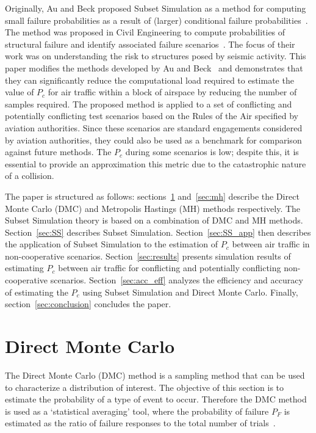 \documentclass[journal]{IEEEtran}
\begin{document}
Originally, Au and Beck proposed Subset Simulation as a method for computing small failure probabilities as a result of (larger) conditional failure probabilities~\cite{au2001estimation}. The method was proposed in Civil Engineering to compute probabilities of structural failure and identify associated failure scenarios~\cite{au2003subset}. The focus of their work was on understanding the risk to structures posed by seismic activity. This paper modifies the methods developed by Au and Beck~\cite{IVAN} and demonstrates that they can significantly reduce the computational load required to estimate the value of $P_{c}$ for air traffic within a block of airspace by reducing the number of samples required. The proposed method is applied to a set of conflicting and potentially conflicting test scenarios based on the Rules of the Air specified by aviation authorities. Since these scenarios are standard engagements considered by aviation authorities, they could also be used as a benchmark for comparison against future methods. The $P_{c}$ during some scenarios is low; despite this, it is essential to provide an approximation this metric due to the catastrophic nature of a collision.

The paper is structured as follows: sections~\ref{sec:DMC} and~\ref{sec:mh} describe the Direct Monte Carlo (DMC) and Metropolis Hastings (MH) methods respectively. The Subset Simulation theory is based on a combination of DMC and MH methods. Section~\ref{sec:SS} describes Subset Simulation. Section~\ref{sec:SS_app} then describes the application of Subset Simulation to the estimation of $P_{c}$ between air traffic in non-cooperative scenarios. Section~\ref{sec:results} presents simulation results of estimating $P_{c}$ between air traffic for conflicting and potentially conflicting non-cooperative scenarios. Section~\ref{sec:acc_eff} analyzes the efficiency and accuracy of estimating the $P_{c}$ using Subset Simulation and Direct Monte Carlo. Finally, section~\ref{sec:conclusion} concludes the paper.

\section{Direct Monte Carlo}
\label{sec:DMC}

The Direct Monte Carlo (DMC) method is a sampling method that can be used to characterize a distribution of interest. The objective of this section is to estimate the probability of a type of event to occur. Therefore the DMC method is used as a `statistical averaging' tool, where the probability of failure $P_{F}$ is estimated as the ratio of failure responses to the total number of trials~\cite{IVAN}.
\end{document}
